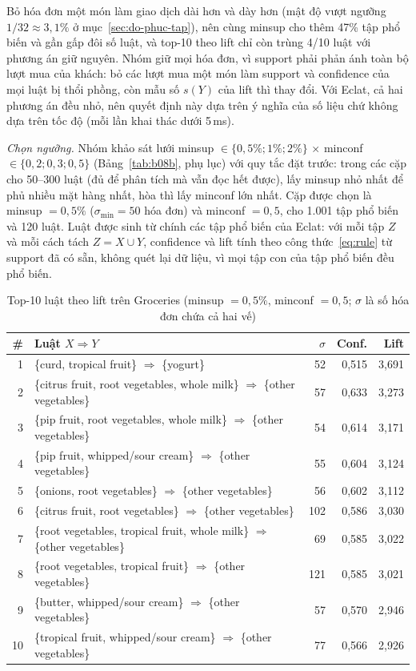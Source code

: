 Bỏ hóa đơn một món làm giao dịch dài hơn và dày hơn (mật độ vượt ngưỡng $1/32 \approx 3{,}1\%$ ở mục~\ref{sec:do-phuc-tap}), nên cùng minsup cho thêm 47\% tập phổ biến và gần gấp đôi số luật, và top-10 theo lift chỉ còn trùng 4/10 luật với phương án giữ nguyên. Nhóm giữ mọi hóa đơn, vì support phải phản ánh toàn bộ lượt mua của khách: bỏ các lượt mua một món làm support và confidence của mọi luật bị thổi phồng, còn mẫu số $s(Y)$ của lift thì thay đổi. Với Eclat, cả hai phương án đều nhỏ, nên quyết định này dựa trên ý nghĩa của số liệu chứ không dựa trên tốc độ (mỗi lần khai thác dưới 5\,ms).

\emph{Chọn ngưỡng.} Nhóm khảo sát lưới minsup $\in \{0{,}5\%; 1\%; 2\%\}$ $\times$ minconf $\in \{0{,}2; 0{,}3; 0{,}5\}$ (Bảng~\ref{tab:b08b}, phụ lục) với quy tắc đặt trước: trong các cặp cho 50--300 luật (đủ để phân tích mà vẫn đọc hết được), lấy minsup nhỏ nhất để phủ nhiều mặt hàng nhất, hòa thì lấy minconf lớn nhất. Cặp được chọn là minsup $= 0{,}5\%$ ($\sigma_{\min} = 50$ hóa đơn) và minconf $= 0{,}5$, cho 1.001 tập phổ biến và 120 luật. Luật được sinh từ chính các tập phổ biến của Eclat: với mỗi tập $Z$ và mỗi cách tách $Z = X \cup Y$, confidence và lift tính theo công thức~\eqref{eq:rule} từ support đã có sẵn, không quét lại dữ liệu, vì mọi tập con của tập phổ biến đều phổ biến.

\begin{table}[t]
\caption{Top-10 luật theo lift trên Groceries (minsup $= 0{,}5\%$, minconf $= 0{,}5$; $\sigma$ là số hóa đơn chứa cả hai vế)}
\label{tab:b09}
\centering
\footnotesize
\setlength{\tabcolsep}{3pt}
\begin{tabular}{@{}rp{4.85cm}rrr@{}}
\toprule
\# & Luật $X \Rightarrow Y$ & $\sigma$ & Conf. & Lift \\
\midrule
1 & \{curd, tropical fruit\} $\Rightarrow$ \{yogurt\} & 52 & 0,515 & 3,691 \\
2 & \{citrus fruit, root vegetables, whole milk\} $\Rightarrow$ \{other vegetables\} & 57 & 0,633 & 3,273 \\
3 & \{pip fruit, root vegetables, whole milk\} $\Rightarrow$ \{other vegetables\} & 54 & 0,614 & 3,171 \\
4 & \{pip fruit, whipped/sour cream\} $\Rightarrow$ \{other vegetables\} & 55 & 0,604 & 3,124 \\
5 & \{onions, root vegetables\} $\Rightarrow$ \{other vegetables\} & 56 & 0,602 & 3,112 \\
6 & \{citrus fruit, root vegetables\} $\Rightarrow$ \{other vegetables\} & 102 & 0,586 & 3,030 \\
7 & \{root vegetables, tropical fruit, whole milk\} $\Rightarrow$ \{other vegetables\} & 69 & 0,585 & 3,022 \\
8 & \{root vegetables, tropical fruit\} $\Rightarrow$ \{other vegetables\} & 121 & 0,585 & 3,021 \\
9 & \{butter, whipped/sour cream\} $\Rightarrow$ \{other vegetables\} & 57 & 0,570 & 2,946 \\
10 & \{tropical fruit, whipped/sour cream\} $\Rightarrow$ \{other vegetables\} & 77 & 0,566 & 2,926 \\
\bottomrule
\end{tabular}
\end{table}

